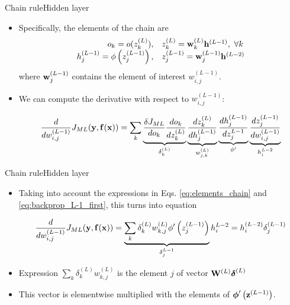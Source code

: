 \documentclass{beamer}
\begin{document}
\begin{frame}{Chain rule}{Hidden layer}

\begin{itemize}
    \item Specifically, the elements of the chain are
\begin{equation}\label{eq:elements_chain}
    \begin{array}{rl}
        o_k = o(z_k^{(L)}), & z_k^{(L)} = {\bf w}_k^{(L)}{\bf h}^{(L-1)},~\forall k \\
    h_j^{(L-1)}=\phi\left(z_j^{(L-1)}\right),
        &z_j^{(L-1)} = {\bf w}_j^{(L-1)}{\bf h}^{(L-2)} \\
    \end{array}
\end{equation}
where  ${\bf w}_j^{(L-1)}$ contains the element of interest  $w_{i,j}^{(L-1)}$. 



\item We can compute the derivative with respect to $w_{i,j}^{(L-1)}$:  

\begin{equation}\label{eq:backprop_L-1_first}
    \frac{d}{dw_{i,j}^{(L-1)}}   J_{ML}({\bf y},{\bf f}({\bf x})) = \sum_{k}
    \underbrace{\frac{\delta J_{ML}}{do_k}\frac{do_k}{dz_k^{(L)}}}_{\delta_k^{(L)}}
    \underbrace{\frac{dz_k^{(L)}}{dh_{j}^{(L-1)}}}_{w_{j,k}^{(L)}}
    \underbrace{\frac{dh_j^{(L-1)}}{dz_j^{L-1}}}_{\phi'}
    \underbrace{\frac{dz_j^{(L-1)}}{dw_{i,j}^{(L-1)}}}_{h_i^{L-2}}
\end{equation}
\end{itemize}
\end{frame}
\begin{frame}{Chain rule}{Hidden layer}
\begin{itemize}
\item Taking into account the expressions in Eqs. \eqref{eq:elements_chain} and \eqref{eq:backprop_L-1_first}, this turns into equation 

\begin{equation}\label{eq:backprop_L-1}
    \frac{d}{dw_{i,j}^{(L-1)}}   J_{ML}({\bf y},{\bf f}({\bf x})) =\underbrace{\sum_{k}
    \delta_k^{(L)}w_{k,j}^{(L)}\phi'\left(z^{(L-1)}_j\right)}_{\delta_j^{L-1}}
    h^{L-2}_i=h^{(L-2)}_i\delta_j^{(L-1)}
\end{equation}
\item Expression $\sum_{k} \delta_k^{(L)}w_{k,j}^{(L)}$ is the element $j$ of vector ${\bf W}^ {(L)}{\boldsymbol \delta}^{(L)}$
\item This vector is elementwise multiplied with the elements of $\boldsymbol{\mathit{\phi}}'\left({\bf z}^{(L-1)}\right)$. 
\end{itemize}

\end{frame}
\end{document}
